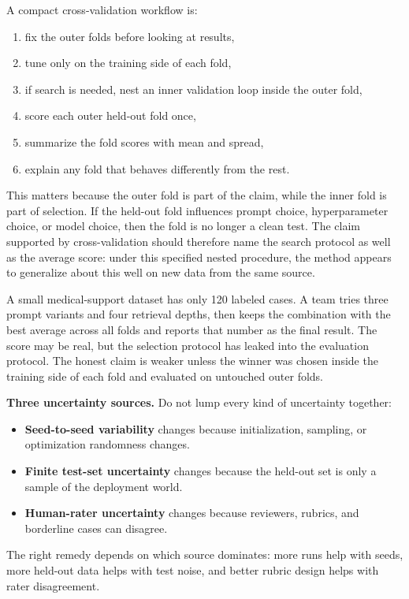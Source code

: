 \begin{practicalnote}
A compact cross-validation workflow is:
\begin{enumerate}[leftmargin=*]
\item fix the outer folds before looking at results,
\item tune only on the training side of each fold,
\item if search is needed, nest an inner validation loop inside the outer fold,
\item score each outer held-out fold once,
\item summarize the fold scores with mean and spread,
\item explain any fold that behaves differently from the rest.
\end{enumerate}
\end{practicalnote}

This matters because the outer fold is part of the claim, while the inner fold is part of selection. If the held-out fold influences prompt choice, hyperparameter choice, or model choice, then the fold is no longer a clean test. The claim supported by cross-validation should therefore name the search protocol as well as the average score: under this specified nested procedure, the method appears to generalize about this well on new data from the same source.

\begin{example}
A small medical-support dataset has only 120 labeled cases. A team tries three prompt variants and four retrieval depths, then keeps the combination with the best average across all folds and reports that number as the final result. The score may be real, but the selection protocol has leaked into the evaluation protocol. The honest claim is weaker unless the winner was chosen inside the training side of each fold and evaluated on untouched outer folds.
\end{example}

\begin{thinkingtool}
\textbf{Three uncertainty sources.} Do not lump every kind of uncertainty together:
\begin{itemize}[leftmargin=*]
\item \textbf{Seed-to-seed variability} changes because initialization, sampling, or optimization randomness changes.
\item \textbf{Finite test-set uncertainty} changes because the held-out set is only a sample of the deployment world.
\item \textbf{Human-rater uncertainty} changes because reviewers, rubrics, and borderline cases can disagree.
\end{itemize}
The right remedy depends on which source dominates: more runs help with seeds, more held-out data helps with test noise, and better rubric design helps with rater disagreement.
\end{thinkingtool}

